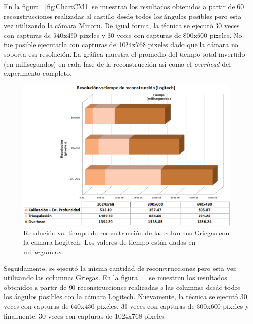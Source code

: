 En la figura ~\ref{fig:ChartCM1} se muestran los resultados obtenidos a partir de 60 reconstrucciones realizadas al castillo desde todos los \'{a}ngulos posibles pero esta vez utilizando la c\'{a}mara Minoru. De igual forma, la t\'{e}cnica se ejecut\'{o} 30 veces con capturas de 640x480 pixeles y 30 veces con capturas de 800x600 pixeles. No fue posible ejecutarla con capturas de 1024x768 pixeles dado que la c\'{a}mara no soporta esa resoluci\'{o}n. La gr\'{a}fica muestra el promedio del tiempo total invertido (en milisegundos) en cada fase de la reconstrucci\'{o}n as\'{i} como el \textit{overhead} del experimento completo.


\begin{figure}[H]
\centering
\includegraphics[width=1.0\textwidth]{images/chart-gl1.png}
\caption[Resoluci\'{o}n vs. tiempo de reconstrucci\'{o}n de las columnas Griegas con la c\'{a}mara Logitech]%
{Resoluci\'{o}n vs. tiempo de reconstrucci\'{o}n de las columnas Griegas con la c\'{a}mara Logitech. Los valores de tiempo est\'{a}n dados en milisegundos.}
\label{fig:ChartGL1}
\end{figure}


Seguidamente, se ejecut\'{o} la misma cantidad de reconstrucciones pero esta vez utilizando las columnas Griegas. En la figura ~\ref{fig:ChartGL1} se muestran los resultados obtenidos a partir de 90 reconstrucciones realizadas a las columnas desde todos los \'{a}ngulos posibles con la c\'{a}mara Logitech. Nuevamente, la t\'{e}cnica se ejecut\'{o} 30 veces con capturas de 640x480 pixeles, 30 veces con capturas de 800x600 pixeles y finalmente, 30 veces con capturas de 1024x768 pixeles.


